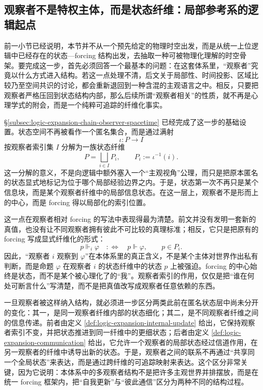 \subsection{观察者不是特权主体，而是状态纤维：局部参考系的逻辑起点}\label{subsec:physical-spacetime-skeleton-observer-fiber}

前一小节已经说明，本节并不从一个预先给定的物理时空出发，而是从统一上位逻辑中已经存在的状态—forcing 结构出发，去抽取一种可被物理化理解的时空骨架。要完成这一步，首先必须回答一个最基本的问题：在这套体系里，“观察者”究竟以什么方式进入结构。若这一点处理不清，后文关于局部性、时间投影、区域比较乃至空间共识的讨论，都会重新退回到一种含混的主观语言之中。相反，只要把观察者严格压回到状态结构内部，那么后续所谓“观察者相关”的性质，就不再是心理学式的附会，而是一个纯粹可追踪的纤维化事实。

\S\ref{subsec:logic-expansion-chain-observer-spacetime} 已经完成了这一步的基础设置。状态空间不再被看作一个匿名集合，而是通过满射
\[
\iota:P\to I
\]
按观察者索引集 \(I\) 分解为一族状态纤维
\[
P=\bigsqcup_{i\in I}P_i,\qquad P_i:=\iota^{-1}(i).
\]
这一分解的意义，不是向逻辑中额外塞入一个“主观视角”公理，而只是把原本匿名的状态显式地标记为位于哪个局部经验边界之内。于是，状态第一次不再只是某个信息块，而是某个观察者纤维中的局部信息状态。在这一层上，观察者不是形而上的中心，而是 forcing 得以局部化的索引位置。

这一点在观察者相对 forcing 的写法中表现得最为清楚。前文并没有发明一套新的真值，也没有让不同观察者拥有彼此不可比较的真理标准；相反，它只是把原有的 forcing 写成显式纤维化的形式：
\[
p\Vdash_i \varphi
\quad:\Longleftrightarrow\quad
p\Vdash \varphi,\qquad p\in P_i.
\]
因此，“观察者 \(i\) 观察到 \(\varphi\)”在本体系里的真正含义，不是某个主体对世界作出私有判断，而是命题 \(\varphi\) 在观察者 \(i\) 的状态纤维中的状态 \(p\) 上被强迫。forcing 的中心始终是状态，而不是某个被心理化了的“我”。观察者索引的作用，仅仅是把“谁在何处可断言什么”写清楚，而不是把真值改写成观察者任意依赖的东西。

一旦观察者被这样纳入结构，就必须进一步区分两类此前在匿名状态层中尚未分开的变化：其一，是同一观察者纤维内部的状态细化；其二，是不同观察者纤维之间的信息传递。前者由定义 \ref{def:logic-expansion-internal-update} 给出，它保持观察者索引不变，并把状态推进到同一纤维中的更细状态；后者由定义 \ref{def:logic-expansion-communication} 给出，它允许一个观察者的局部状态经过信道作用，在另一观察者的纤维中诱导出新的状态。于是，观察者之间的联系不再通过“共享同一个全局状态”来表达，而是通过跨纤维的可追踪映射来表达。这个区分非常关键，因为它说明：本体系中的多观察者结构不是把许多主观世界并排摆放，而是在统一 forcing 框架内，把“自我更新”与“彼此通信”区分为两种不同的结构过程。

